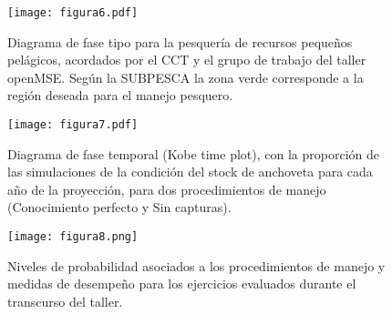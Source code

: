 
\begin{figure}[H]
    \centering
    \texttt{[image: figura6.pdf]}
    \caption{Diagrama de fase tipo para la pesquería de recursos pequeños pelágicos, acordados por el CCT y el grupo de trabajo del taller openMSE. Según la SUBPESCA la zona verde corresponde a la región deseada para el manejo pesquero.}
    \label{fig:figure6}
\end{figure}

\begin{figure}[H]
    \centering
    \texttt{[image: figura7.pdf]}
    \caption{Diagrama de fase temporal (Kobe time plot), con la proporción de las simulaciones de la condición del stock de anchoveta para cada año de la proyección, para dos procedimientos de manejo (Conocimiento perfecto y Sin capturas).}
    \label{fig:figure7}
\end{figure}

\begin{figure}[H]
    \centering
    \texttt{[image: figura8.png]}
    \caption{Niveles de probabilidad asociados a los procedimientos de manejo y medidas de desempeño para los ejercicios evaluados durante el transcurso del taller.}
    \label{fig:figura8}
\end{figure}